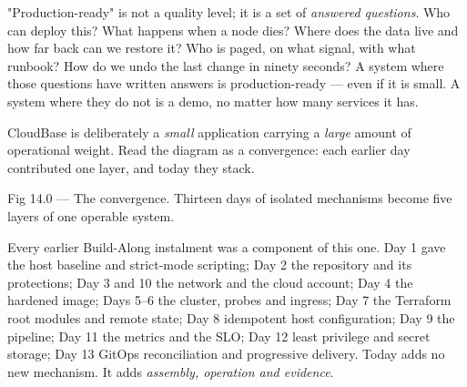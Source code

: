 \begin{keyidea}
"Production-ready" is not a quality level; it is a set of \emph{answered questions}. Who can deploy this? What happens when a node dies? Where does the data live and how far back can we restore it? Who is paged, on what signal, with what runbook? How do we undo the last change in ninety seconds? A system where those questions have written answers is production-ready --- even if it is small. A system where they do not is a demo, no matter how many services it has.
\end{keyidea}

 CloudBase is deliberately a \emph{small} application carrying a \emph{large} amount of operational weight. Read the diagram as a convergence: each earlier day contributed one layer, and today they stack.

\begin{wbfigure}{Fig 14.0 — The convergence. Thirteen days of isolated mechanisms become five layers of one operable system.}
\end{wbfigure}

 Every earlier Build-Along instalment was a component of this one. Day 1 gave the host baseline and strict-mode scripting; Day 2 the repository and its protections; Day 3 and 10 the network and the cloud account; Day 4 the hardened image; Days 5--6 the cluster, probes and ingress; Day 7 the Terraform root modules and remote state; Day 8 idempotent host configuration; Day 9 the pipeline; Day 11 the metrics and the SLO; Day 12 least privilege and secret storage; Day 13 GitOps reconciliation and progressive delivery. Today adds no new mechanism. It adds \emph{assembly, operation and evidence}.

